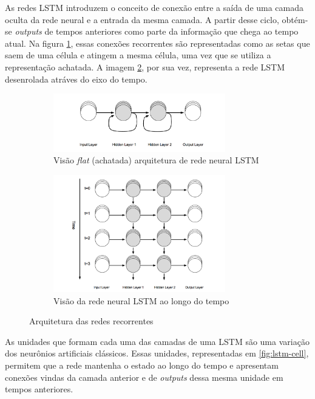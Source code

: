As redes LSTM introduzem o conceito de conexão entre a saída de uma 
camada oculta da rede neural e a entrada da mesma camada. A partir desse
ciclo, obtém-se \textit{outputs} de tempos anteriores como parte da informação que 
chega ao tempo atual. Na figura \ref{fig:arq-rnn-flat}, essas 
conexões recorrentes são representadas como as setas que saem de uma célula e 
atingem a mesma célula, uma vez que se utiliza a representação achatada.
A imagem \ref{fig:arq-rnnff}, por sua vez, representa a rede LSTM desenrolada 
atráves do eixo do tempo.

\begin{figure}[H]
  \centering
  \begin{subfigure}{7.5cm}
      \centering
      \includegraphics[width=7.5cm]{../figuras/redes/arq-rnn-flat.png}
      \caption{Visão \textit{flat} (achatada) arquitetura de rede neural LSTM }
      \label{fig:arq-rnn-flat}
  \end{subfigure}
  \begin{subfigure}{7.5cm}
    \centering
    \includegraphics[width=7.5cm]{../figuras/redes/arq-rnn.png}
    \caption{Visão da rede neural LSTM ao longo do tempo}
    \label{fig:arq-rnnff}
  \end{subfigure}
  \hfill
  \label{fig:comparacao-rnn-flat-normal}
  \caption{Arquitetura das redes recorrentes}
\end{figure}

As unidades que formam cada uma das camadas de uma LSTM são uma variação dos
neurônios artificiais clássicos. Essas unidades, representadas em \ref{fig:lstm-cell},
 permitem que a rede mantenha o estado
ao longo do tempo e apresentam conexões vindas da camada anterior e de \textit{outputs} 
dessa
mesma unidade em tempos anteriores.

